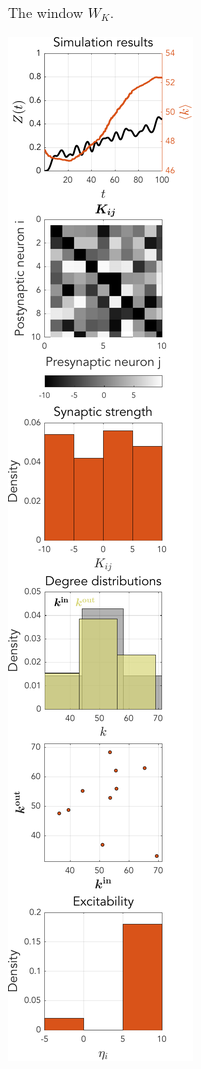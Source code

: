 \begin{figure}[H]
\begin{subfigure}[b]{0.32\linewidth}
   \caption{The window $W_K$.}
   \label{fig:STDPWK} 
\end{subfigure} \hfill
\begin{subfigure}[b]{0.32\linewidth}
   \centering
  \includegraphics[width=\linewidth, trim={0 0 0 0},clip]{../Figures/Learning/STDPandIPSong.pdf}

\end{subfigure}
\end{figure}
